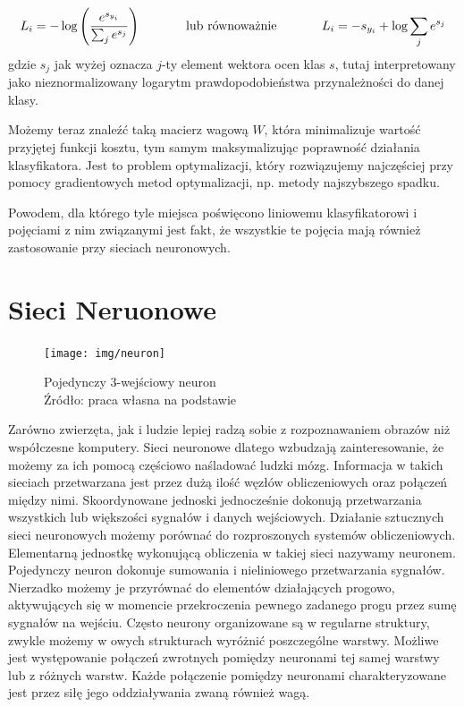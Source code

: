 \begin{equation}\label{eqn:single_loss_softmax}
L_i = -\log\left(\frac{e^{s_{y_i}}}{ \sum_j e^{s_j} }\right) \hspace{0.5in} \text{lub równoważnie} \hspace{0.5in} L_i = -s_{y_i} + \log\sum_j e^{s_j}
\end{equation}
gdzie $s_j$ jak wyżej oznacza $j$-ty element wektora ocen klas $s$, tutaj interpretowany jako nieznormalizowany logarytm prawdopodobieństwa przynależności do danej klasy.

Możemy teraz znaleźć taką macierz wagową $W$, która minimalizuje wartość przyjętej funkcji kosztu, tym samym maksymalizując poprawność działania klasyfikatora.
Jest to problem optymalizacji, który rozwiązujemy najczęściej przy pomocy gradientowych metod optymalizacji, np. metody najszybszego spadku. \cite{cs231n}

Powodem, dla którego tyle miejsca poświęcono liniowemu klasyfikatorowi i pojęciami z nim związanymi jest fakt, że wszystkie te pojęcia mają również zastosowanie przy sieciach neuronowych.

\section{Sieci Neruonowe}\label{sec:nn}

\begin{figure}[h!tb]
	 \centering
	 \texttt{[image: img/neuron]}
	 \caption{Pojedynczy 3-wejściowy neuron \\
              Źródło: praca własna na podstawie \cite{cs231n,zuradabarskijedruch1996}}
	 \label{fig:neuron}
\end{figure}

Zarówno zwierzęta, jak i ludzie lepiej radzą sobie z rozpoznawaniem obrazów niż współczesne komputery.
Sieci neuronowe dlatego wzbudzają zainteresowanie, że możemy za ich pomocą częściowo naśladować ludzki mózg.
Informacja w takich sieciach przetwarzana jest przez dużą ilość węzłów obliczeniowych oraz połączeń między nimi.
Skoordynowane jednoski jednocześnie dokonują przetwarzania wszystkich lub większości sygnałów i danych wejściowych.
Działanie sztucznych sieci neuronowych możemy porównać do rozproszonych systemów obliczeniowych.
Elementarną jednostkę wykonującą obliczenia w takiej sieci nazywamy neuronem.
Pojedynczy neuron dokonuje sumowania i nieliniowego przetwarzania sygnałów.
Nierzadko możemy je przyrównać do elementów działających progowo, aktywujących się w momencie przekroczenia pewnego zadanego progu przez sumę sygnałów na wejściu.
Często neurony organizowane są w regularne struktury, zwykle możemy w owych strukturach wyróżnić poszczególne warstwy.
Możliwe jest występowanie połączeń zwrotnych pomiędzy neuronami tej samej warstwy lub z różnych warstw.
Każde połączenie pomiędzy neuronami charakteryzowane jest przez siłę jego oddziaływania zwaną również wagą. \cite{zuradabarskijedruch1996}

